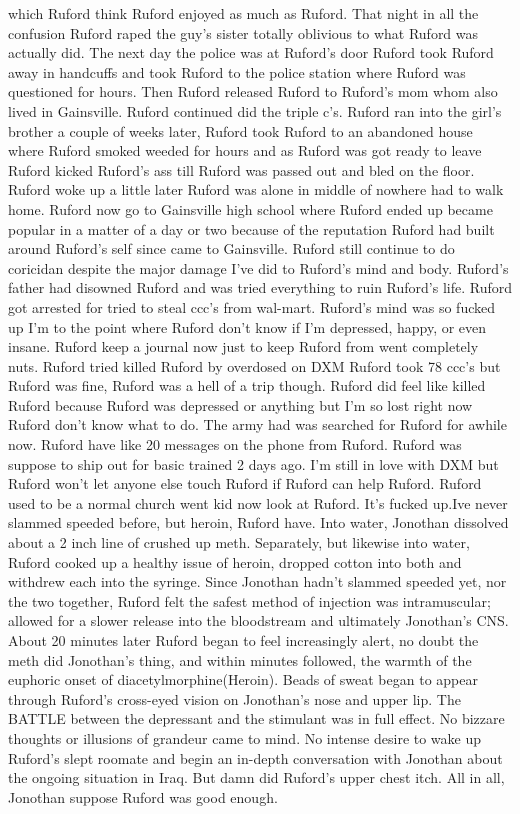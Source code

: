 \documentclass[12pt]{book}
\begin{document}
which Ruford think Ruford enjoyed as much as Ruford. That night in all the confusion Ruford raped the guy's sister totally oblivious to what Ruford was actually did. The next day the police was at Ruford's door Ruford took Ruford away in handcuffs and took Ruford to the police station where Ruford was questioned for hours. Then Ruford released Ruford to Ruford's mom whom also lived in Gainsville. Ruford continued did the triple c's. Ruford ran into the girl's brother a couple of weeks later, Ruford took Ruford to an abandoned house where Ruford smoked weeded for hours and as Ruford was got ready to leave Ruford kicked Ruford's ass till Ruford was passed out and bled on the floor. Ruford woke up a little later Ruford was alone in middle of nowhere had to walk home. Ruford now go to Gainsville high school where Ruford ended up became popular in a matter of a day or two because of the reputation Ruford had built around Ruford's self since came to Gainsville. Ruford still continue to do coricidan despite the major damage I've did to Ruford's mind and body. Ruford's father had disowned Ruford and was tried everything to ruin Ruford's life. Ruford got arrested for tried to steal ccc's from wal-mart. Ruford's mind was so fucked up I'm to the point where Ruford don't know if I'm depressed, happy, or even insane. Ruford keep a journal now just to keep Ruford from went completely nuts. Ruford tried killed Ruford by overdosed on DXM Ruford took 78 ccc's but Ruford was fine, Ruford was a hell of a trip though. Ruford did feel like killed Ruford because Ruford was depressed or anything but I'm so lost right now Ruford don't know what to do. The army had was searched for Ruford for awhile now. Ruford have like 20 messages on the phone from Ruford. Ruford was suppose to ship out for basic trained 2 days ago. I'm still in love with DXM but Ruford won't let anyone else touch Ruford if Ruford can help Ruford. Ruford used to be a normal church went kid now look at Ruford. It's fucked up.Ive never slammed speeded before, but heroin, Ruford have. Into water, Jonothan dissolved about a 2 inch line of crushed up meth. Separately, but likewise into water, Ruford cooked up a healthy issue of heroin, dropped cotton into both and withdrew each into the syringe. Since Jonothan hadn't slammed speeded yet, nor the two together, Ruford felt the safest method of injection was intramuscular; allowed for a slower release into the bloodstream and ultimately Jonothan's CNS. About 20 minutes later Ruford began to feel increasingly alert, no doubt the meth did Jonothan's thing, and within minutes followed, the warmth of the euphoric onset of diacetylmorphine(Heroin). Beads of sweat began to appear through Ruford's cross-eyed vision on Jonothan's nose and upper lip. The BATTLE between the depressant and the stimulant was in full effect. No bizzare thoughts or illusions of grandeur came to mind. No intense desire to wake up Ruford's slept roomate and begin an in-depth conversation with Jonothan about the ongoing situation in Iraq. But damn did Ruford's upper chest itch. All in all, Jonothan suppose Ruford was good enough.
\end{document}

